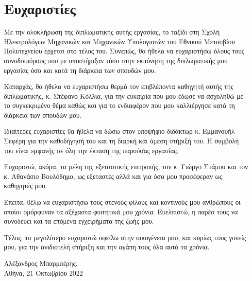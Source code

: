 \chapter*{Ευχαριστίες}

Με την ολοκλήρωση της διπλωματικής αυτής εργασίας, το ταξίδι στη Σχολή Ηλεκτρολόγων Μηχανικών και Μηχανικών Υπολογιστών του Εθνικού Μετσοβίου Πολυτεχνείου έρχεται στο τέλος του. Συνεπώς, θα ήθελα να ευχαριστήσω όλους τους συνοδοιπόρους που με υποστήριξαν τόσο στην εκπόνηση της διπλωματικής μου εργασίας όσο και κατά τη διάρκεια των σπουδών μου.\par

Καταρχάς, θα ήθελα να ευχαριστήσω θερμά τον επιβλέποντα καθηγητή αυτής της διπλωματικής, κ. Στέφανο Κόλλια, για την ευκαιρία που μου έδωσε να ασχοληθώ με το συγκεκριμένο θέμα καθώς και για το ενδιαφέρον που μου καλλιέργησε κατά τη διάρκεια των σπουδών μου.\par

Ιδιαίτερες ευχαριστίες θα ήθελα να δώσω στον υποψήφιο διδάκτωρ κ. Εμμανουήλ Σεφέρη για την καθοδήγησή του και τη διαρκή και άμεση στήριξή του. Η συμβολή του είναι εμφανής σε όλη την έκταση της παρούσας εργασίας.\par

Ευχαριστώ, ακόμα, τα μέλη της εξεταστικής επιτροπής, τον κ. Γιώργο Στάμου και τον
κ. Αθανάσιο Βουλόδημο, ως εξεταστές αλλά και για όσα μου προσέφεραν ως καθηγητές
μου.\par

Έπειτα, θέλω να ευχαριστήσω τους στενούς φίλους και κοντινούς μου ανθρώπους οι οποίοι ομόρφυναν τα αξέχαστα φοιτητικά μου χρόνια. Ευελπιστώ, η παρέα τους να συνοδεύει και τα επόμενα εγχειρήματα της ζωής μου.\par

Τέλος, το μεγαλύτερο ευχαριστώ οφείλω στην οικογένεια μου, και κυρίως τους γονείς μου, για την ανιδιοτελή στήριξη και την αγάπη τους όλα αυτά τα χρόνια.\par
\begin{flushright}
    Αλέξανδρος Μπαρμπέρης,\\
    Αθήνα, 21 Οκτωβρίου 2022
\end{flushright}
